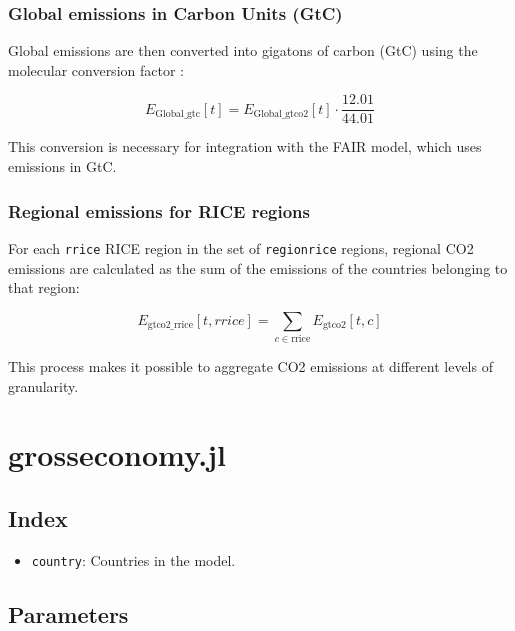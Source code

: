 \documentclass[
]{article}
\providecommand{\tightlist}{%
  \setlength{\itemsep}{0pt}\setlength{\parskip}{0pt}}
\begin{document}
\subsubsection{Global emissions in Carbon Units
(GtC)}\label{global-emissions-in-carbon-units-gtc}

Global emissions are then converted into gigatons of carbon (GtC) using
the molecular conversion factor :

\begin{equation}
 E_{\text{Global\_gtc}}[t] = E_{\text{Global\_gtco2}}[t] \cdot \frac{12.01}{44.01} 
\end{equation}


This conversion is necessary for integration with the FAIR model, which
uses emissions in GtC.

\subsubsection{Regional emissions for RICE
regions}\label{regional-emissions-for-rice-regions}

For each \texttt{rrice} RICE region in the set of \texttt{regionrice}
regions, regional CO2 emissions are calculated as the sum of the
emissions of the countries belonging to that region:

\begin{equation}
 E_{\text{gtco2\_rrice}}[t,rrice] = \sum_{c \in \text{rrice}} E_{\text{gtco2}}[t,c] 
\end{equation}


This process makes it possible to aggregate CO2 emissions at different
levels of granularity.

\section{grosseconomy.jl}\label{grosseconomy.jl}

\subsection{Index}\label{index}

\begin{itemize}
\tightlist
\item
  \texttt{country}: Countries in the model.
\end{itemize}

\subsection{Parameters}\label{parameters-3}
\end{document}
